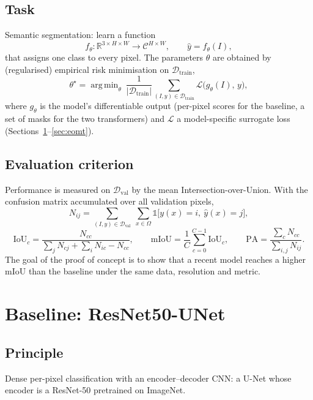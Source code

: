 \documentclass[11pt,a4paper]{article}
\newcommand{\R}{\mathbb{R}}
\newcommand{\1}{\mathbb{1}}
\DeclareMathOperator*{\argmin}{arg\,min}
\begin{document}
\subsection{Task}

Semantic segmentation: learn a function
\[
f_\theta : \R^{3\times H\times W} \longrightarrow \mathcal{C}^{H\times W},
\qquad \hat y = f_\theta(I),
\]
that assigns one class to every pixel. The parameters $\theta$ are obtained by
(regularised) empirical risk minimisation on $\mathcal{D}_{\text{train}}$,
\[
\theta^\star = \argmin_\theta\ \frac{1}{|\mathcal{D}_{\text{train}}|}
\sum_{(I,y)\in\mathcal{D}_{\text{train}}} \mathcal{L}\big(g_\theta(I),\,y\big),
\]
where $g_\theta$ is the model's differentiable output (per-pixel scores for the
baseline, a set of masks for the two transformers) and $\mathcal{L}$ a
model-specific surrogate loss (Sections~\ref{sec:baseline}--\ref{sec:eomt}).

\subsection{Evaluation criterion}

Performance is measured on $\mathcal{D}_{\text{val}}$ by the mean
Intersection-over-Union. With the confusion matrix accumulated over all
validation pixels,
\[
N_{ij} = \sum_{(I,y)\in\mathcal{D}_{\text{val}}}\ \sum_{x\in\Omega}
\1\big[y(x)=i,\ \hat y(x)=j\big],
\]
\[
\mathrm{IoU}_c = \frac{N_{cc}}{\sum_j N_{cj} + \sum_i N_{ic} - N_{cc}},
\qquad
\mathrm{mIoU} = \frac{1}{C}\sum_{c=0}^{C-1}\mathrm{IoU}_c,
\qquad
\mathrm{PA} = \frac{\sum_c N_{cc}}{\sum_{i,j}N_{ij}} .
\]
The goal of the proof of concept is to show that a recent model reaches a
higher mIoU than the baseline under the same data, resolution and metric.

\section{Baseline: ResNet50-UNet}\label{sec:baseline}

\subsection{Principle}

Dense per-pixel classification with an encoder--decoder CNN: a U-Net
\cite{ronneberger2015} whose encoder is a ResNet-50 \cite{he2016} pretrained
on ImageNet.
\end{document}
